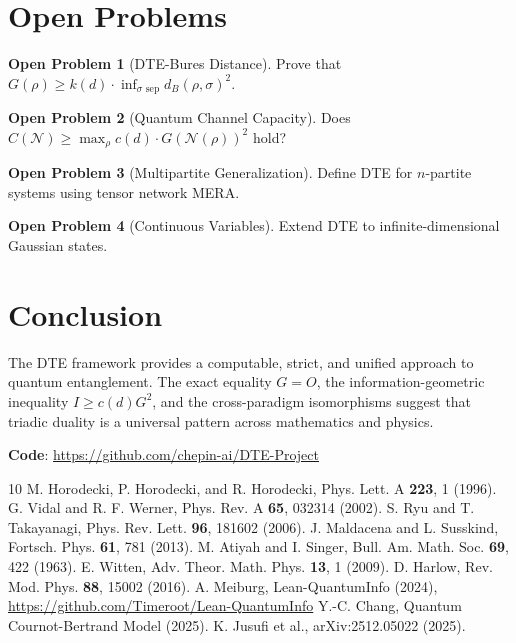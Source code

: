 \documentclass[11pt,a4paper]{article}
\theoremstyle{definition}
\newtheorem{open}{Open Problem}[section]
\begin{document}
\section{Open Problems}
\label{sec:open}

\begin{open}[DTE-Bures Distance]
Prove that $G(\rho) \geq k(d) \cdot \inf_{\sigma \text{ sep}} d_B(\rho, \sigma)^2$.
\end{open}

\begin{open}[Quantum Channel Capacity]
Does $C(\mathcal{N}) \geq \max_\rho c(d) \cdot G(\mathcal{N}(\rho))^2$ hold?
\end{open}

\begin{open}[Multipartite Generalization]
Define DTE for $n$-partite systems using tensor network MERA.
\end{open}

\begin{open}[Continuous Variables]
Extend DTE to infinite-dimensional Gaussian states.
\end{open}

\section{Conclusion}
\label{sec:conclusion}

The DTE framework provides a computable, strict, and unified approach to quantum entanglement. The exact equality $G = O$, the information-geometric inequality $I \geq c(d)G^2$, and the cross-paradigm isomorphisms suggest that triadic duality is a universal pattern across mathematics and physics.

\vspace{1em}
\noindent\textbf{Code}: \url{https://github.com/chepin-ai/DTE-Project}


\begin{thebibliography}{10}
 M. Horodecki, P. Horodecki, and R. Horodecki, Phys. Lett. A \textbf{223}, 1 (1996).
 G. Vidal and R. F. Werner, Phys. Rev. A \textbf{65}, 032314 (2002).
 S. Ryu and T. Takayanagi, Phys. Rev. Lett. \textbf{96}, 181602 (2006).
 J. Maldacena and L. Susskind, Fortsch. Phys. \textbf{61}, 781 (2013).
 M. Atiyah and I. Singer, Bull. Am. Math. Soc. \textbf{69}, 422 (1963).
 E. Witten, Adv. Theor. Math. Phys. \textbf{13}, 1 (2009).
 D. Harlow, Rev. Mod. Phys. \textbf{88}, 15002 (2016).
 A. Meiburg, Lean-QuantumInfo (2024), \url{https://github.com/Timeroot/Lean-QuantumInfo}
 Y.-C. Chang, Quantum Cournot-Bertrand Model (2025).
 K. Jusufi et al., arXiv:2512.05022 (2025).
\end{thebibliography}
\end{document}
